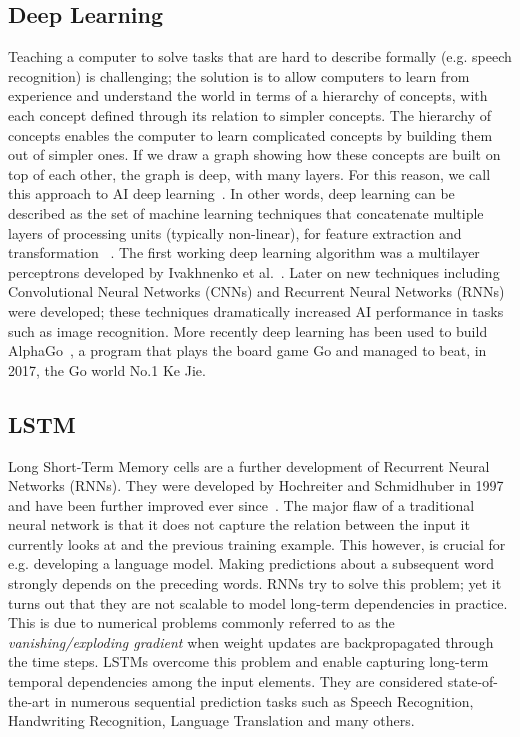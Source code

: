 \subsection{Deep Learning}
Teaching a computer to solve tasks that are hard to describe formally (e.g. speech recognition) is challenging; the solution is to allow computers to learn from experience and understand the world in terms of a hierarchy of concepts, with each concept defined through its relation to simpler concepts. The hierarchy of concepts enables the computer to learn complicated concepts by building them out of simpler ones. If we draw a graph showing how these concepts are built on top of each other, the graph is deep, with many layers. For this reason, we call this approach to AI deep learning~\cite{Goodfellow-et-al-2016}. In other words, deep learning can be described as the set of machine learning techniques that concatenate multiple layers of processing units (typically non-linear), for feature extraction and transformation  ~\cite{deep_learning_heterogeneus}. The first working deep learning algorithm was a multilayer perceptrons developed by Ivakhnenko et al.~\cite{ivakhnenko1973cybernetic}. Later on new techniques including Convolutional Neural Networks (CNNs) and Recurrent Neural Networks (RNNs) were developed; these techniques dramatically increased AI performance in tasks such as image recognition. More recently deep learning has been used to build AlphaGo~\cite{alphago}, a program that plays the board game Go and managed to beat, in 2017, the Go world No.1 Ke Jie.

\subsection{LSTM}
Long Short-Term Memory cells are a further development of Recurrent Neural Networks (RNNs). They were developed by Hochreiter and Schmidhuber in 1997 and have been further improved ever since~\cite{Greff2016}. The major flaw of a traditional neural network is that it does not capture the relation between the input it currently looks at and the previous training example. This however, is crucial for e.g. developing a language model. Making predictions about a subsequent word strongly depends on the preceding words. RNNs try to solve this problem; yet it turns out that they are not scalable to model long-term dependencies in practice. This is due to numerical problems commonly referred to as the \textit{vanishing/exploding gradient} when weight updates are backpropagated through the time steps. LSTMs overcome this problem and enable capturing long-term temporal dependencies among the input elements. They are considered state-of-the-art in numerous sequential prediction tasks such as Speech Recognition, Handwriting Recognition, Language Translation and many others.

